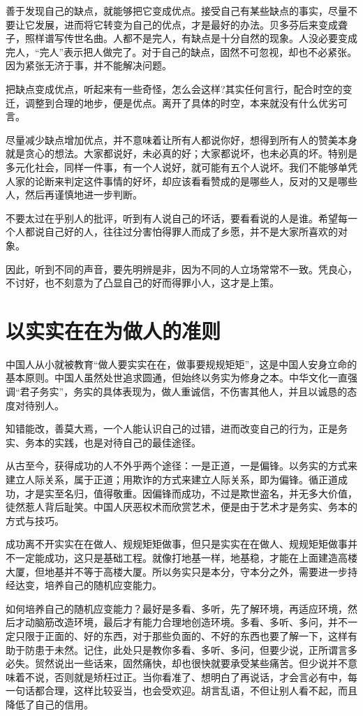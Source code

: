 \documentclass[fontset=fandol, a4paper, 12pt, openright]{ctexbook}
\begin{document}
善于发现自己的缺点，就能够把它变成优点。接受自己有某些缺点的事实，尽量不要让它发展，进而将它转变为自己的优点，才是最好的办法。贝多芬后来变成聋子，照样谱写传世名曲。人都不是完人，有缺点是十分自然的现象。人没必要变成完人，“完人”表示把人做完了。对于自己的缺点，固然不可忽视，却也不必紧张。因为紧张无济于事，并不能解决问题。

把缺点变成优点，听起来有一些奇怪，怎么会这样?其实任何言行，配合时空的变迁，调整到合理的地步，便是优点。离开了具体的时空，本来就没有什么优劣可言。

尽量减少缺点增加优点，并不意味着让所有人都说你好，想得到所有人的赞美本身就是贪心的想法。大家都说好，未必真的好；大家都说坏，也未必真的坏。特别是多元化社会，同样一件事，有一个人说好，就可能有五个人说坏。我们不能够单凭人家的论断来判定这件事情的好坏，却应该看看赞成的是哪些人，反对的又是哪些人，然后再谨慎地进一步判断。

不要太过在乎别人的批评，听到有人说自己的坏话，要看看说的人是谁。希望每一个人都说自己好的人，往往过分害怕得罪人而成了乡愿，并不是大家所喜欢的对象。

因此，听到不同的声音，要先明辨是非，因为不同的人立场常常不一致。凭良心，不讨好，也不刻意为了凸显自己的好而得罪小人，这才是上策。

\section{以实实在在为做人的准则}

中国人从小就被教育“做人要实实在在，做事要规规矩矩”，这是中国人安身立命的基本原则。中国人虽然处世追求圆通，但始终以务实为修身之本。中华文化一直强调“君子务实”，务实的具体表现为，做人重诚信，不伤害其他人，并且以诚恳的态度对待别人。

知错能改，善莫大焉，一个人能认识自己的过错，进而改变自己的行为，正是务实、务本的实践，也是对待自己的最佳途径。

从古至今，获得成功的人不外乎两个途径：一是正道，一是偏锋。以务实的方式来建立人际关系，属于正道；用欺诈的方式来建立人际关系，即为偏锋。循正道成功，才是实至名归，值得敬重。因偏锋而成功，不过是欺世盗名，并无多大价值，徒然惹人背后耻笑。中国人厌恶权术而欣赏艺术，便是由于艺术才是务实、务本的方式与技巧。

成功离不开实实在在做人、规规矩矩做事，但只是实实在在做人、规规矩矩做事并不一定能成功，这只是基础工程。就像打地基一样，地基稳，才能在上面建造高楼大厦，但地基并不等于高楼大厦。所以务实只是本分，守本分之外，需要进一步持经达变，培养自己的随机应变能力。

如何培养自己的随机应变能力？最好是多看、多听，先了解环境，再适应环境，然后才动脑筋改造环境，最后才有能力合理地创造环境。多看、多听、多问，并不一定只限于正面的、好的东西，对于那些负面的、不好的东西也要了解一下，这样有助于防患于未然。记住，此处只是教你多看、多听、多问，但要少说，正所谓言多必失。贸然说出一些话来，固然痛快，却也很快就要承受某些痛苦。但少说并不意味着不说，否则就是矫枉过正。当你看准了、想明白了再说话，才会言必有中，每一句话都合理，这样比较妥当，也会受欢迎。胡言乱语，不但让别人看不起，而且降低了自己的信用。
\end{document}

